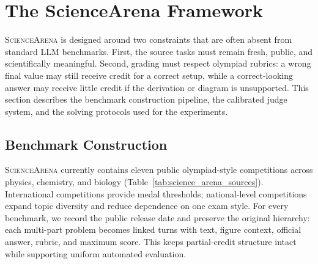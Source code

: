 \documentclass[11pt]{article}
\begin{document}
\section{The ScienceArena Framework}\label{sec:2}
\textsc{ScienceArena} is designed around two constraints that are often absent from standard LLM benchmarks.
First, the source tasks must remain fresh, public, and scientifically meaningful.
Second, grading must respect olympiad rubrics: a wrong final value may still receive credit for a correct setup, while a correct-looking answer may receive little credit if the derivation or diagram is unsupported.
This section describes the benchmark construction pipeline, the calibrated judge system, and the solving protocols used for the experiments.


\subsection{Benchmark Construction}
\textsc{ScienceArena} currently contains eleven public olympiad-style competitions across physics, chemistry, and biology (Table~\ref{tab:science_arena_sources}).
International competitions provide medal thresholds; national-level competitions expand topic diversity and reduce dependence on one exam style.
For every benchmark, we record the public release date and preserve the original hierarchy: each multi-part problem becomes linked turns with text, figure context, official answer, rubric, and maximum score.
This keeps partial-credit structure intact while supporting uniform automated evaluation.
\end{document}
